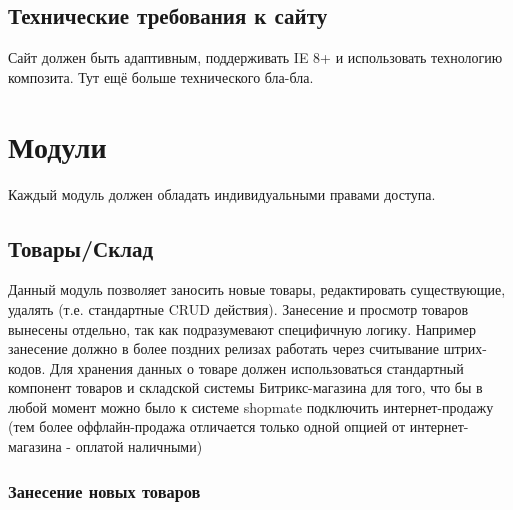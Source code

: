 \documentclass[DIV=calc, paper=a4, fontsize=11pt]{scrartcl} %
\begin{document}
\subsection{Технические требования к сайту}
Сайт должен быть адаптивным, поддерживать IE 8+ и использовать технологию композита.
Тут ещё больше технического бла-бла.


\section{Модули}

Каждый модуль должен обладать индивидуальными правами доступа.

\subsection{Товары/Склад}

Данный модуль позволяет заносить новые товары, редактировать существующие, удалять (т.е. стандартные CRUD действия). Занесение и просмотр товаров вынесены отдельно, так как подразумевают специфичную логику. Например занесение должно в более поздних релизах работать через считывание штрих-кодов. Для хранения данных о товаре должен использоваться стандартный компонент товаров и складской системы Битрикс-магазина для того, что бы в любой момент можно было к системе shopmate подключить интернет-продажу (тем более оффлайн-продажа отличается только одной опцией от интернет-магазина - оплатой наличными) 

\subsubsection{Занесение новых товаров}
\end{document}
